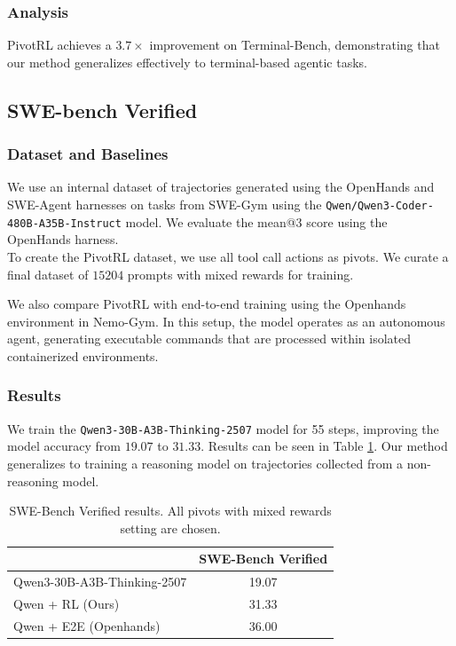 \subsubsection{Analysis}
PivotRL achieves a $3.7\times$ improvement on Terminal-Bench, demonstrating that our method generalizes effectively to terminal-based agentic tasks.

\subsection{SWE-bench Verified}
\subsubsection{Dataset and Baselines}
We use an internal dataset of trajectories generated using the OpenHands \citep{wang2025openhandsopenplatformai} and SWE-Agent \citep{yang2024sweagentagentcomputerinterfacesenable} harnesses on tasks from SWE-Gym \citep{pan2025trainingsoftwareengineeringagents} using the \texttt{Qwen/Qwen3-Coder-480B-A35B-Instruct} \citep{qwen3technicalreport} model. We evaluate the mean@3 score using the OpenHands harness. \\
To create the PivotRL dataset, we use all tool call actions as pivots. We curate a final dataset of $15204$ prompts with mixed rewards for training.

We also compare PivotRL with end-to-end training using the Openhands environment in Nemo-Gym. In this setup, the model operates as an autonomous agent, generating executable commands that are processed within isolated containerized environments.

\subsubsection{Results}
We train the \texttt{Qwen3-30B-A3B-Thinking-2507} model for 55 steps, improving the model accuracy from $19.07$ to $31.33$. Results can be seen in Table \ref{table:results_swebench}. Our method generalizes to training a reasoning model on trajectories collected from a non-reasoning model.

\begin{table}[t]
\small
\centering
\setlength{\tabcolsep}{6pt}
\begin{tabular}{lc}
\toprule
& \textbf{SWE-Bench Verified} \\
\midrule
Qwen3-30B-A3B-Thinking-2507 & 19.07 \\
\midrule
Qwen + RL (Ours)            & 31.33 \\
\midrule
Qwen + E2E (Openhands)            & 36.00 \\
\bottomrule
\end{tabular}
\caption{SWE-Bench Verified results. All pivots with mixed rewards setting are chosen.}
\label{table:results_swebench}
\end{table}


